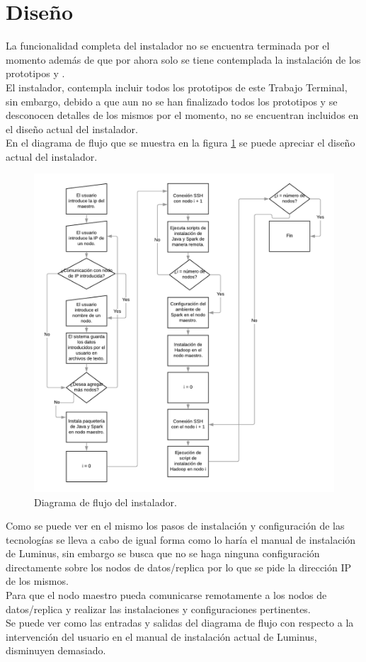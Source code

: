 \section{Diseño}
La funcionalidad completa del instalador no se encuentra terminada por el momento además de que por ahora solo se tiene contemplada la instalación de los prototipos  y . 
\\
El instalador, contempla incluir todos los prototipos de este Trabajo Terminal, sin embargo, debido a que aun no se han finalizado todos los prototipos y se desconocen detalles de los mismos por el momento, no se encuentran incluidos en el diseño actual del instalador.
\\
En el diagrama de flujo que se muestra en la figura \ref{fig:diagramaFlujo} se puede apreciar el diseño actual del instalador.
\begin{figure}[!htbp]
	\hypertarget{fig:diagramaFlujo}{\hspace{1pt}}
	\begin{center}
		\includegraphics[width=.9\textwidth]{capitulo5/images/diagramaFlujo.png}
		\caption{Diagrama de flujo del instalador.}
		\label{fig:diagramaFlujo}
	\end{center}
\end{figure}
\newpage
Como se puede ver en el mismo los pasos de instalación y configuración de las tecnologías se lleva a cabo de igual forma como lo haría el manual de instalación de Luminus, sin embargo se busca que no se haga ninguna configuración directamente sobre los nodos de datos/replica por lo que se pide la dirección IP de los mismos. 
\\
Para que el nodo maestro pueda comunicarse remotamente a los nodos de datos/replica y realizar las instalaciones y configuraciones pertinentes.
\\
Se puede ver como las entradas y salidas del diagrama de flujo con respecto a la intervención del usuario en el manual de instalación actual de Luminus, disminuyen demasiado.
